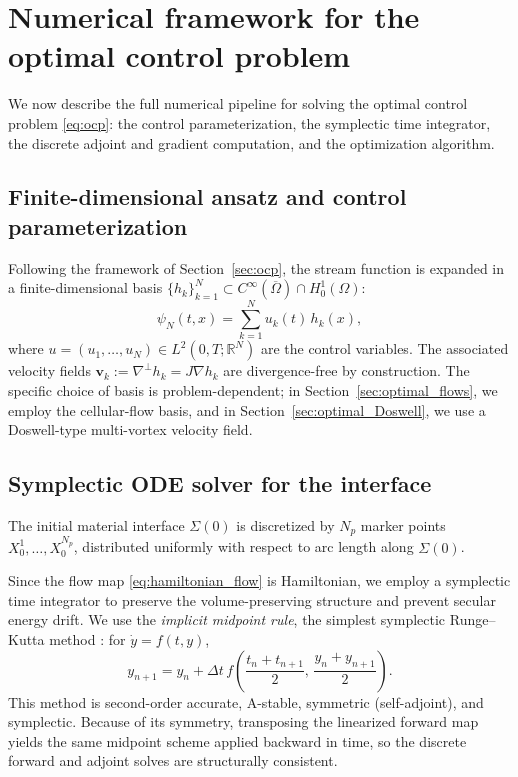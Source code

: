 \documentclass[12pt, reqno]{amsart}
\theoremstyle{plain}
\theoremstyle{definition}
\numberwithin{equation}{section}
\numberwithin{figure}{section}
\numberwithin{algorithm}{section}
\begin{document}
\section{Numerical framework for the optimal control problem}\label{sec:numerics}

We now describe the full numerical pipeline for solving the optimal control problem \eqref{eq:ocp}: the control parameterization, the symplectic time integrator, the discrete adjoint and gradient computation, and the optimization algorithm.

\subsection{Finite-dimensional ansatz and control parameterization}\label{sec:ansatz}

Following the framework of Section~\ref{sec:ocp}, the stream function is expanded in a finite-dimensional basis $\{h_k\}_{k=1}^N\subset C^\infty(\overline\Omega)\cap H_0^1(\Omega)$:
\begin{equation*}
\psi_N(t,x)=\sum_{k=1}^N u_k(t)\,h_k(x),
\end{equation*}
where $u=(u_1,\dots,u_N)\in L^2(0,T;\mathbb R^N)$ are the control variables. The associated velocity fields $\mathbf v_k:=\nabla^\perp h_k=J\nabla h_k$ are divergence-free by construction. The specific choice of basis is problem-dependent; in Section~\ref{sec:optimal_flows}, we employ the cellular-flow basis, and in Section~\ref{sec:optimal_Doswell}, we use a Doswell-type multi-vortex velocity field.

\subsection{Symplectic ODE solver for the interface}\label{sec:symplectic}

The initial material interface $\Sigma(0)$ is discretized by $N_p$ marker points $X_0^1,\dots,X_0^{N_p}$, distributed uniformly with respect to arc length along $\Sigma(0)$.

Since the flow map \eqref{eq:hamiltonian_flow} is Hamiltonian, we employ a symplectic time integrator \cite{HLW06} to preserve the volume-preserving structure and prevent secular energy drift. We use the \emph{implicit midpoint rule}, the simplest symplectic Runge--Kutta method \cite{HLW06}: for $\dot y=f(t,y)$,
\begin{equation}\label{eq:midpoint_def}
y_{n+1}=y_n+\Delta t\,f\!\left(\frac{t_n+t_{n+1}}{2},\,\frac{y_n+y_{n+1}}{2}\right).
\end{equation}
This method is second-order accurate, A-stable, symmetric (self-adjoint), and symplectic. Because of its symmetry, transposing the linearized forward map yields the same midpoint scheme applied backward in time, so the discrete forward and adjoint solves are structurally consistent.
\end{document}
